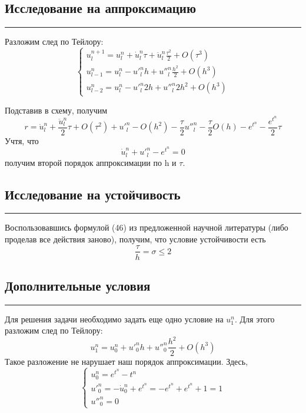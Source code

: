 \documentclass[12pt,a4paper, titlepage]{article}
\begin{document}
\subsection*{Исследование на аппроксимацию}
\noindent\rule{\textwidth}{1pt}
Разложим след по Тейлору:
\begin{equation}
\begin{cases}
u^{n+1}_l = u^n_l + \dot{u}^n_l \tau + \ddot{u}^n_l \frac{\tau^2}{2} + O(\tau^3)
\\
u^n_{l-1} = u^n_l - u'^n_l h + u''^n_l \frac{h^2}{2} + O(h^3)
\\
u^n_{l-2} = u^n_l - u'^n_l 2h + u''^n_l 2h^2 + O(h^3)
\end{cases}
\end{equation}

Подставив в схему, получим
\begin{equation}
r = \dot{u}^n_l + \frac{\ddot{u}^n_l}{2} \tau + O(\tau^2) + u'^n_l - O(h^2) - \frac{\tau}{2} u''^n_l - \frac{\tau}{2} O(h) - e^{t^n} - \frac{e^{t^n}}{2}\tau
\end{equation}
Учтя, что 
\begin{equation}
\dot{u}^n_l + u'^n_l - e^{t^n} = 0
\end{equation}
получим второй порядок аппроксимации по h и $\tau$.
\subsection*{Исследование на устойчивость}
\noindent\rule{\textwidth}{1pt}
Воспользовавшись формулой (46) из предложенной научной литературы (либо проделав все действия заново), получим, что условие устойчивости есть 
\begin{equation}
\frac{\tau}{h} = \sigma  \leq 2
\end{equation}

\subsection*{Дополнительные условия}
\noindent\rule{\textwidth}{1pt}
Для решения задачи необходимо задать еще одно условие на $u^n_1$. Для этого разложим след по Тейлору:
\begin{equation}
u^n_{1} = u^n_0 + u'^n_0 h + u''^n_0 \frac{h^2}{2} + O(h^3)
\end{equation}
Такое разложение не нарушает наш порядок аппроксимации.
Здесь, 
\begin{equation}
\begin{cases}
u^n_0 = e^{t^n} - t^n
\\
u'^n_0 = -\dot{u}^n_0 + e^{t^n} = -e^{t^n} + e^{t^n} + 1 = 1
\\
u''^n_0 = 0
\end{cases}
\end{equation}
\end{document}
